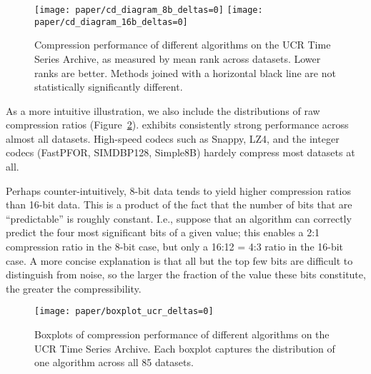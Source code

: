 \begin{figure}[h]
\begin{center}
    \texttt{[image: paper/cd\_diagram\_8b\_deltas=0]}
    \texttt{[image: paper/cd\_diagram\_16b\_deltas=0]}
    \caption{Compression performance of different algorithms on the UCR Time Series Archive, as measured by mean rank across datasets. Lower ranks are better. Methods joined with a horizontal black line are not statistically significantly different.}
    \label{fig:ratioCD}
\end{center}
\end{figure}

As a more intuitive illustration, we also include the distributions of raw compression ratios (Figure~\ref{fig:ratioBox}). \minesp exhibits consistently strong performance across almost all datasets. High-speed codecs such as Snappy, LZ4, and the integer codecs (FastPFOR, SIMDBP128, Simple8B) hardely compress most datasets at all.

Perhaps counter-intuitively, 8-bit data tends to yield higher compression ratios than 16-bit data. This is a product of the fact that the number of bits that are ``predictable'' is roughly constant. I.e., suppose that an algorithm can correctly predict the four most significant bits of a given value; this enables a 2:1 compression ratio in the 8-bit case, but only a 16:12 = 4:3 ratio in the 16-bit case. A more concise explanation is that all but the top few bits are difficult to distinguish from noise, so the larger the fraction of the value these bits constitute, the greater the compressibility.

\begin{figure}[h]
\begin{center}
    \texttt{[image: paper/boxplot\_ucr\_deltas=0]}
    \caption{Boxplots of compression performance of different algorithms on the UCR Time Series Archive. Each boxplot captures the distribution of one algorithm across all 85 datasets.}
    \label{fig:ratioBox}
\end{center}
\end{figure}


